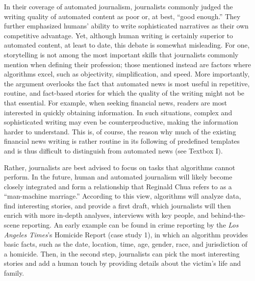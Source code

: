 \documentclass[notoc, symmetric, nobib, nols]{towcenter-guideto-book}
\begin{document}
In their coverage of automated journalism, journalists commonly judged the writing quality of automated content as poor or, at best, ``good enough.''  They further emphasized humans' ability to write sophisticated narratives as their own competitive advantage. Yet, although human writing is certainly superior to automated content, at least to date, this debate is somewhat misleading. For one, storytelling is not among the most important skills that journalists commonly mention when defining their profession; those mentioned instead are factors where algorithms excel, such as objectivity, simplification, and speed.\autocite{wei12} More importantly, the argument overlooks the fact that automated news is most useful in repetitive, routine, and fact-based stories for which the quality of the writing might not be that essential. For example, when seeking financial news, readers are most interested in quickly obtaining information. In such situations, complex and sophisticated writing may even be counterproductive, making the information harder to understand. This is, of course, the reason why much of the existing financial news writing is rather routine in its following of predefined templates and is thus difficult to distinguish from automated news (see Textbox I). 

Rather, journalists are best advised to focus on tasks that algorithms cannot perform. In the future, human and automated journalism will likely become closely integrated and form a relationship that Reginald Chua refers to as a ``man-machine marriage.'' According to this view, algorithms will analyze data, find interesting stories, and provide a first draft, which journalists will then enrich with more in-depth analyses, interviews with key people, and behind-the-scene reporting. An early example can be found in crime reporting by the \textit{Los Angeles Times}'s Homicide Report (case study 1), in which an algorithm provides basic facts, such as the date, location, time, age, gender, race, and jurisdiction of a homicide. Then, in the second step, journalists can pick the most interesting stories and add a human touch by providing details about the victim's life and family.\autocite{young15} 
\end{document}
